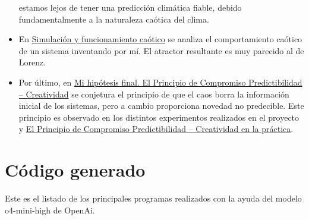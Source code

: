 \documentclass[
  10pt,
  a4paper,
  DIV=11,
  numbers=noendperiod,
  open=any]{scrreprt}
\numberwithin{equation}{chapter}
\numberwithin{equation}{section}
\renewcommand{\[}{\begin{equation}}
\renewcommand{\]}{\end{equation}}
\begin{document}
\begin{itemize}
  estamos lejos de tener una predicción climática fiable, debido
  fundamentalmente a la naturaleza caótica del clima.
\item
  En
  \href{https://colacaos.github.io/ColaCAOS/05-experimentos/intro.html}{Simulación
  y funcionamiento caótico} se analiza el comportamiento caótico de un
  sistema inventando por mí. El atractor resultante es muy parecido al
  de Lorenz.
\item
  Por último, en
  \href{https://colacaos.github.io/ColaCAOS/06-filosofia/determinismo07.html}{Mi
  hipótesis final. El Principio de Compromiso Predictibilidad --
  Creatividad} se conjetura el principio de que el caos borra la
  información inicial de los sistemas, pero a cambio proporciona novedad
  no predecible. Este principio es observado en los distintos
  experimentos realizados en el proyecto y
  \href{https://colacaos.github.io/ColaCAOS/06-filosofia/determinismo08.html}{El
  Principio de Compromiso Predictibilidad -- Creatividad en la
  práctica}.
\end{itemize}

\section{Código generado}\label{cuxf3digo-generado}

Este es el listado de los principales programas realizados con la ayuda
del modelo o4-mini-high de OpenAi.
\end{document}
